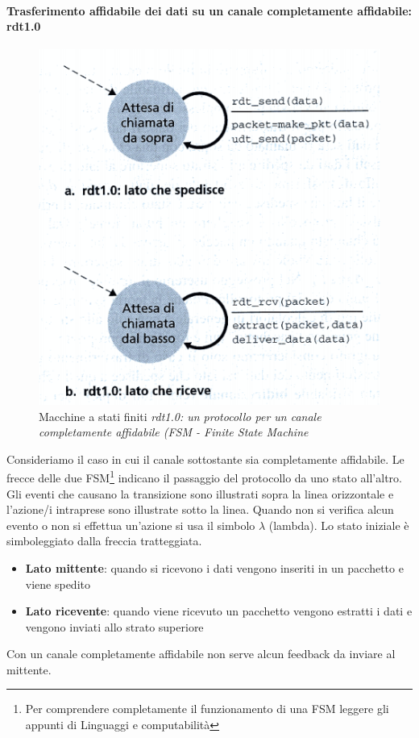 \documentclass[11pt,a4paper]{article}
\begin{document}
\paragraph{Trasferimento affidabile dei dati su un canale completamente affidabile: rdt1.0}
\begin{figure}
	\includegraphics[scale=0.6]{img/017.png}
	\caption{Macchine a stati finiti \textit{rdt1.0: un protocollo per un canale completamente affidabile (FSM - Finite State Machine}}
\end{figure}
Consideriamo il caso in cui il canale sottostante sia completamente affidabile.
Le frecce delle due FSM\footnote{Per comprendere completamente il funzionamento di una FSM leggere gli appunti di Linguaggi e computabilità} indicano il passaggio del protocollo da uno stato all'altro. Gli eventi che causano la transizione sono illustrati sopra la linea orizzontale e l'azione/i intraprese sono illustrate sotto la linea. Quando non si verifica alcun evento o non si effettua un'azione si usa il simbolo $\lambda$ (lambda). Lo stato iniziale è simboleggiato dalla freccia tratteggiata. \\
\begin{itemize}
	\item \textbf{Lato mittente}: quando si ricevono i dati vengono inseriti in un pacchetto e viene spedito
	\item \textbf{Lato ricevente}: quando viene ricevuto un pacchetto vengono estratti i dati e vengono inviati allo strato superiore
\end{itemize}
Con un canale completamente affidabile non serve alcun feedback da inviare al mittente.
\end{document}
